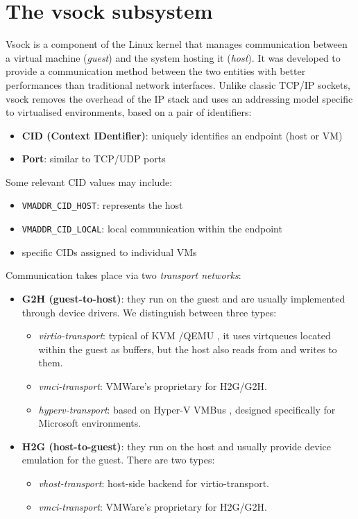 \section{The vsock subsystem}\label{vsock_subsystem}
Vsock is a component of the Linux kernel that manages communication between a virtual machine (\textit{guest}) and the system hosting it (\textit{host}). It was developed to provide a communication method between the two entities with better performances than traditional network interfaces.
Unlike classic TCP/IP sockets, vsock removes the overhead of the IP stack and uses an addressing model specific to virtualised environments, based on a pair of identifiers:
\begin{itemize}
    \item \textbf{CID (Context IDentifier)}: uniquely identifies an endpoint (host or VM)
    \item \textbf{Port}: similar to TCP/UDP ports
\end{itemize}
Some relevant CID values may include:
\begin{itemize}
    \item \texttt{VMADDR\_CID\_HOST}: represents the host
    \item \texttt{VMADDR\_CID\_LOCAL}: local communication within the endpoint
    \item specific CIDs assigned to individual VMs
\end{itemize}
Communication takes place via two \emph{transport networks}:
\begin{itemize}
    \item \textbf{G2H (guest-to-host)}: they run on the guest and are usually implemented through device drivers. We distinguish between three types:
    \begin{itemize}
        \item \textit{virtio-transport}: typical of KVM \cite{bib:kvm}/QEMU \cite{bib:qemu}, it uses virtqueues located within the guest as buffers, but the host also reads from and writes to them.

        \item \textit{vmci-transport}: VMWare's \cite{bib:vmware-disco} proprietary for H2G/G2H.

        \item \textit{hyperv-transport}: based on Hyper-V VMBus \cite{bib:hyperv}, designed specifically for Microsoft environments.
    \end{itemize}

    \item \textbf{H2G (host-to-guest)}: they run on the host and usually provide device emulation for the guest. There are two types:
    \begin{itemize}
        \item \textit{vhost-transport}: host-side backend for virtio-transport.

        \item \textit{vmci-transport}: VMWare's proprietary for H2G/G2H.
    \end{itemize}
\end{itemize}
